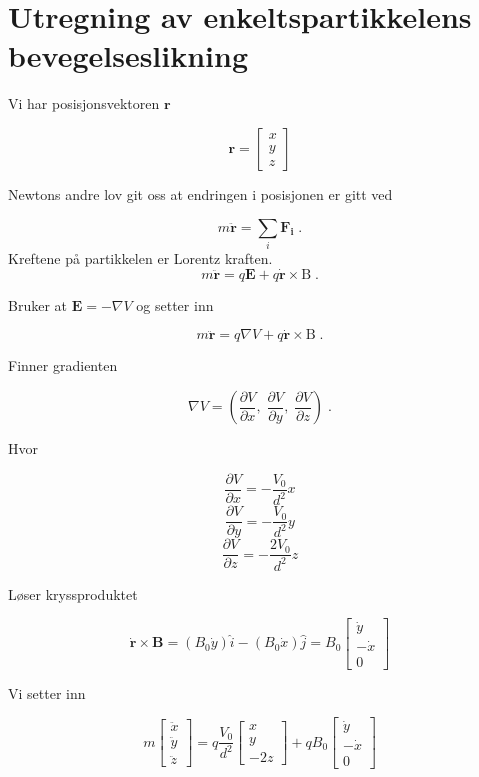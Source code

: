 \documentclass[reprint,english,notitlepage, nofootinbib]{revtex4-1}  %
\begin{document}
\section{Utregning av enkeltspartikkelens bevegelseslikning}\label{ap:moteq}

Vi har posisjonsvektoren $\mathbf{r}$

$$\mathbf{r} = \begin{bmatrix}
x \\ y \\ z 
\end{bmatrix}$$

Newtons andre lov git oss at endringen i posisjonen er gitt ved

$$m \ddot{\mathbf{r}} = \sum_i \mathbf{F_i} \; .$$
Kreftene på partikkelen er Lorentz kraften.
$$m \ddot{\mathbf{r}} = q \mathbf{E} + q \dot{\mathbf{r}} \times\mathrm{B} \; .$$

Bruker at $\mathbf{E} = -\nabla{V}$ og setter inn

$$m \ddot{\mathbf{r}} = q \nabla{V} + q \dot{\mathbf{r}} \times\mathrm{B} \; .$$

Finner gradienten

$$\nabla{V} = \left ( \frac{\partial V}{\partial x}, \; \frac{\partial V}{\partial y}, \; \frac{\partial V}{\partial z} \right ) \; .$$

Hvor

$$ \frac{\partial V}{\partial x} = -\frac{V_0}{d^2}x$$
$$ \frac{\partial V}{\partial y} = - \frac{V_0}{d^2}y$$
$$ \frac{\partial V}{\partial z} = - \frac{2V_0}{d^2}z$$

Løser kryssproduktet

$$\dot{\mathbf{r}} \times \mathbf{B} = (B_0 \dot{y})\hat{i} - (B_0\dot{x})\hat{j} = B_0 \begin{bmatrix}
\dot{y} \\ -\dot{x} \\ 0
\end{bmatrix}$$

Vi setter inn

$$ m \begin{bmatrix} \ddot{x} \\ \ddot{y} \\ \ddot{z} \end{bmatrix} = q \frac{V_0}{d^2} \begin{bmatrix}
x \\ y \\ -2z 
\end{bmatrix} + q B_0 \begin{bmatrix}
\dot{y} \\ -\dot{x} \\ 0
\end{bmatrix}$$
\end{document}
